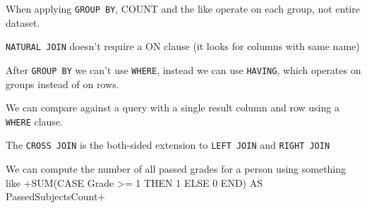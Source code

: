 When applying \texttt{GROUP BY}, COUNT and the like operate on each group, not entire dataset.

\texttt{NATURAL JOIN} doesn't require a ON clause (it looks for columns with same name)

After \texttt{GROUP BY} we can't use \texttt{WHERE}, instead we can use \texttt{HAVING}, which operates on groups instead of on rows.

We can compare against a query with a single result column and row using a \texttt{WHERE} clause.

The \texttt{CROSS JOIN} is the both-sided extension to \texttt{LEFT JOIN} and \texttt{RIGHT JOIN}

We can compute the number of all passed grades for a person using something like
+SUM(CASE Grade >= 1 THEN 1 ELSE 0 END) AS PassedSubjectsCount+
